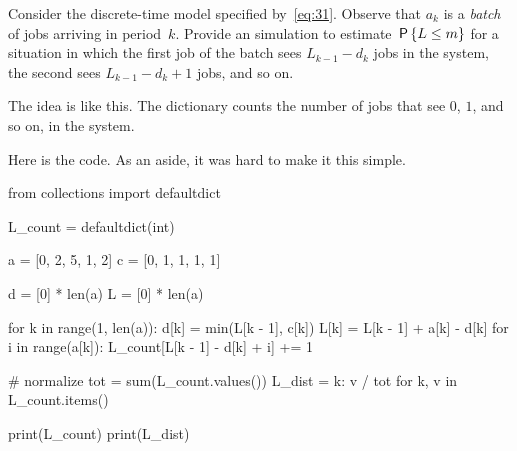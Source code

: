 \begin{exercise}\label{ex:l-166}
Consider 
 the discrete-time model specified by~\cref{eq:31}. Observe that $a_{k}$ is a \emph{batch} of jobs arriving in period~$k$.
Provide an simulation to estimate  $\,\mathsf{P}\left\{L\leq m\right\}$ for a situation in which  the first job of the batch sees $L_{k-1} - d_k$ jobs in the system,
the second sees $L_{k-1}-d_k + 1$ jobs, and so on.
\begin{solution}
The idea is like this. The dictionary  counts the number of jobs that see $0$, $1$, and so on, in the system.

Here is the code. As an aside, it was hard to make it this simple.
\begin{pyconsole}
from collections import defaultdict

L_count = defaultdict(int)

a = [0, 2, 5, 1, 2]
c = [0, 1, 1, 1, 1]

d = [0] * len(a)
L = [0] * len(a)

for k in range(1, len(a)):
    d[k] = min(L[k - 1], c[k])
    L[k] = L[k - 1] + a[k] - d[k]
    for i in range(a[k]):
        L_count[L[k - 1] - d[k] + i] += 1


# normalize
tot = sum(L_count.values())
L_dist = {k: v / tot for k, v in L_count.items()}

print(L_count)
print(L_dist)
\end{pyconsole}

\end{solution}
\end{exercise}



